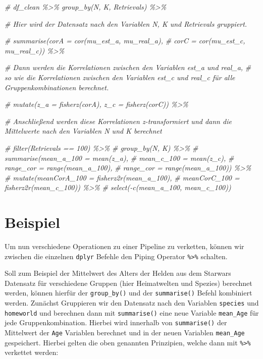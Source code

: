 \documentclass[
  ngerman,
]{book}
\newenvironment{Shaded}{\begin{snugshade}}{\end{snugshade}}
\newcommand{\CommentTok}[1]{\textcolor[rgb]{0.56,0.35,0.01}{\textit{#1}}}
\begin{document}
\begin{Shaded}
\begin{Highlighting}[]
\CommentTok{\# df\_clean \%\textgreater{}\% group\_by(N, K, Retrievals) \%\textgreater{}\%}

\CommentTok{\# Hier wird der Datensatz nach den Variablen N, K und Retrievals gruppiert.}

\CommentTok{\#   summarise(corA = cor(mu\_est\_a, mu\_real\_a), }
\CommentTok{\#             corC = cor(mu\_est\_c, mu\_real\_c)) \%\textgreater{}\%}

\CommentTok{\# Dann werden die Korrelationen zwischen den Variablen est\_a und real\_a,}
\CommentTok{\# so wie die Korrelationen zwischen den Variablen est\_c und real\_c für alle Gruppenkombinationen berechnet.}

\CommentTok{\#   mutate(z\_a = fisherz(corA), z\_c = fisherz(corC)) \%\textgreater{}\% }

\CommentTok{\# Anschließend werden diese Korrelationen z{-}transformiert und dann die Mittelwerte nach den Variablen N und K berechnet}

\CommentTok{\#   filter(Retrievals == 100) \%\textgreater{}\%}
\CommentTok{\#   group\_by(N, K) \%\textgreater{}\%  }
\CommentTok{\#   summarise(mean\_a\_100 = mean(z\_a),}
\CommentTok{\#             mean\_c\_100 = mean(z\_c),}
\CommentTok{\#             range\_cor = range(mean\_a\_100),}
\CommentTok{\#             range\_cor = range(mean\_a\_100)) \%\textgreater{}\%}
\CommentTok{\#   mutate(meanCorA\_100 = fisherz2r(mean\_a\_100),}
\CommentTok{\#          meanCorC\_100 = fisherz2r(mean\_c\_100)) \%\textgreater{}\%}
\CommentTok{\#   select({-}c(mean\_a\_100, mean\_c\_100))}
\end{Highlighting}
\end{Shaded}

\section{Beispiel}\label{beispiel}

Um nun verschiedene Operationen zu einer Pipeline zu verketten, können wir zwischen die einzelnen \texttt{dplyr} Befehle den Piping Operator \texttt{\%\textgreater{}\%} schalten.

Soll zum Beispiel der Mittelwert des Alters der Helden aus dem Starwars Datensatz für verschiedene Gruppen (hier Heimatwelten und Spezies) berechnet werden, können hierfür der \texttt{group\_by()} und der \texttt{summarise()} Befehl kombiniert werden. Zunächst Gruppieren wir den Datensatz nach den Variablen \texttt{species} und \texttt{homeworld} und berechnen dann mit \texttt{summarise()} eine neue Variable \texttt{mean\_Age} für jede Gruppenkombination. Hierbei wird innerhalb von \texttt{summarise()} der Mittelwert der \texttt{Age} Variablen berechnet und in der neuen Variablen \texttt{mean\_Age} gespeichert. Hierbei gelten die oben genannten Prinzipien, welche dann mit \texttt{\%\textgreater{}\%} verkettet werden:
\end{document}
